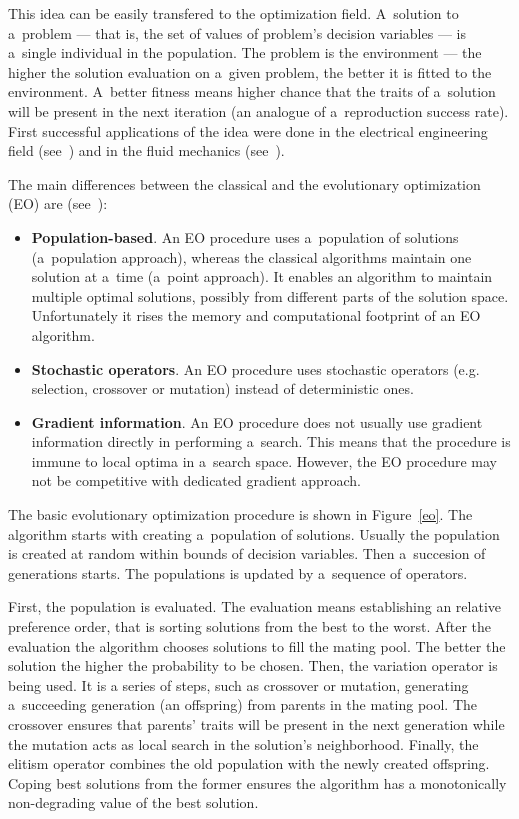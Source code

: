 This idea can be easily transfered to the optimization field. A~solution to
a~problem --- that is, the set of values of problem's decision variables ---
is a~single individual in the population. The problem is the environment ---
the higher the solution evaluation on a~given problem, the better it is fitted
to the environment. A~better fitness means higher chance that the traits of
a~solution will be present in the next iteration (an analogue of
a~reproduction success rate). First successful applications of the idea were
done in the electrical engineering field (see~\cite{Fog64}) and in the fluid
mechanics (see~\cite{Rec65, Sch65}).

The main differences between the classical and the evolutionary optimization
(EO) are (see~\cite{Deb08}):

\begin{itemize}
\item \textbf{Population-based}. An EO procedure uses a~population of
  solutions (a~population approach), whereas the classical algorithms maintain
  one solution at a~time (a~point approach). It enables an algorithm to
  maintain multiple optimal solutions, possibly from different parts of the
  solution space. Unfortunately it rises the memory and computational
  footprint of an EO algorithm.
\item \textbf{Stochastic operators}. An EO procedure uses stochastic operators
  (e.g. selection, crossover or mutation) instead of deterministic ones.
\item \textbf{Gradient information}. An EO procedure does not usually use
  gradient information directly in performing a~search. This means that the
  procedure is immune to local optima in a~search space. However, the EO
  procedure may not be competitive with dedicated gradient approach.
\end{itemize}

The basic evolutionary optimization procedure is shown in Figure~\ref{eo}. The
algorithm starts with creating a~population of solutions. Usually the
population is created at random within bounds of decision variables. Then
a~succesion of generations starts. The populations is updated by a~sequence of
operators.

First, the population is evaluated. The evaluation means establishing an
relative preference order, that is sorting solutions from the best to the
worst. After the evaluation the algorithm chooses solutions to fill the mating
pool. The better the solution the higher the probability to be chosen. Then,
the variation operator is being used. It is a series of steps, such as
crossover or mutation, generating a~succeeding generation (an offspring) from
parents in the mating pool. The crossover ensures that parents' traits will be
present in the next generation while the mutation acts as local search in the
solution's neighborhood. Finally, the elitism operator combines the old
population with the newly created offspring. Coping best solutions from the
former ensures the algorithm has a monotonically non-degrading value of the
best solution.

